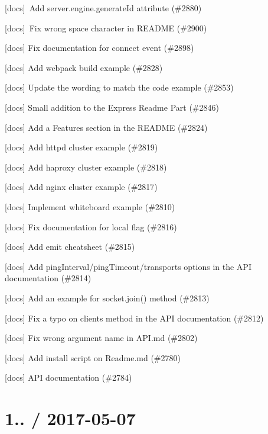 \begin{DoxyItemize}
\item \mbox{[}docs\mbox{]} \+Add server.\+engine.\+generate\+Id attribute (\#2880)
\item \mbox{[}docs\mbox{]} \+Fix wrong space character in R\+E\+A\+D\+ME (\#2900)
\item \mbox{[}docs\mbox{]} Fix documentation for \textquotesingle{}connect\textquotesingle{} event (\#2898)
\item \mbox{[}docs\mbox{]} Add webpack build example (\#2828)
\item \mbox{[}docs\mbox{]} Update the wording to match the code example (\#2853)
\item \mbox{[}docs\mbox{]} Small addition to the Express Readme Part (\#2846)
\item \mbox{[}docs\mbox{]} Add a \textquotesingle{}Features\textquotesingle{} section in the R\+E\+A\+D\+ME (\#2824)
\item \mbox{[}docs\mbox{]} Add httpd cluster example (\#2819)
\item \mbox{[}docs\mbox{]} Add haproxy cluster example (\#2818)
\item \mbox{[}docs\mbox{]} Add nginx cluster example (\#2817)
\item \mbox{[}docs\mbox{]} Implement whiteboard example (\#2810)
\item \mbox{[}docs\mbox{]} Fix documentation for {\ttfamily local} flag (\#2816)
\item \mbox{[}docs\mbox{]} Add emit cheatsheet (\#2815)
\item \mbox{[}docs\mbox{]} Add ping\+Interval/ping\+Timeout/transports options in the A\+PI documentation (\#2814)
\item \mbox{[}docs\mbox{]} Add an example for socket.\+join() method (\#2813)
\item \mbox{[}docs\mbox{]} Fix a typo on {\ttfamily clients} method in the A\+PI documentation (\#2812)
\item \mbox{[}docs\mbox{]} Fix wrong argument name in A\+P\+I.\+md (\#2802)
\item \mbox{[}docs\mbox{]} Add install script on Readme.\+md (\#2780)
\item \mbox{[}docs\mbox{]} A\+PI documentation (\#2784)
\end{DoxyItemize}

\section*{1.. / 2017-\/05-\/07 }


